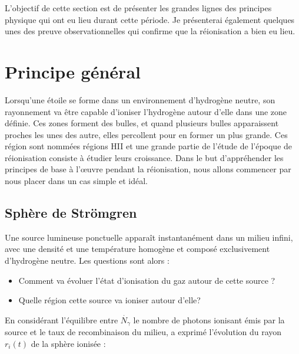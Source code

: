 L'objectif de cette section est de présenter les grandes lignes des principes physique qui ont eu lieu durant cette période.
Je présenterai également quelques unes des preuve observationnelles qui confirme que la réionisation a bien eu lieu.


\section{Principe général}

Lorsqu'une étoile se forme dans un environnement d'hydrogène neutre, son rayonnement va être capable d'ioniser l'hydrogène autour d'elle dans une zone définie.
Ces zones forment des bulles, et quand plusieurs bulles apparaissent proches les unes des autre, elles percollent pour en former un plus grande.
Ces région sont nommées régions HII et une grande partie de l'étude de l'époque de réionisation consiste à étudier leurs croissance.
Dans le but d’appréhender les principes de base à l’œuvre pendant la réionisation, nous allons commencer par nous placer dans un cas simple et idéal.

\subsection{Sphère de Strömgren}
\label{sec:stromgren}

Une source lumineuse ponctuelle apparaît instantanément dans un milieu infini, avec une densité et une température homogène et composé exclusivement d’hydrogène neutre.
Les questions sont alors : 
\begin{itemize}
\item Comment va évoluer l’état d'ionisation du gaz autour de cette source ?
\item Quelle région cette source va ioniser autour d'elle?
\end{itemize}

En considérant l'équilibre entre $\dot{N_\gamma}$ le nombre de photons ionisant émis par la source et le taux de recombinaison du milieu, \cite{stromgren_physical_1939} a exprimé l'évolution du rayon  $r_i(t)$ de la sphère ionisée :

